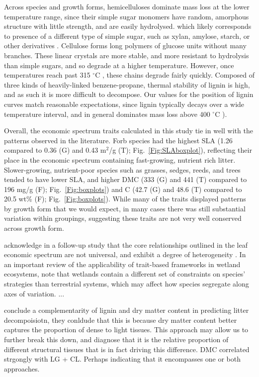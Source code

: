 \documentclass{article}
\begin{document}
Across species and growth forms, hemicelluloses dominate mass loss at the lower temperature range, since their simple sugar monomers have random, amorphous structure with little strength, and are easily hydrolysed. which likely corresponds to presence of a different type of simple sugar, such as xylan, amylose, starch, or other derivatives \citep{muller-hagedorn2007}. Cellulose forms long polymers of glucose units without many branches. These linear crystals are more stable, and more resistant to hydrolysis than simple sugars, and so degrade at a higher temperature. However, once temperatures reach past 315 $^{\circ}$C \citep{muller-hagedorn2007}, these chains degrade fairly quickly. Composed of three kinds of heavily-linked benzene-propane, thermal stability of lignin is high, and as such it is more difficult to decompose. Our values for the position of lignin curves match reasonable expectations, since lignin typically decays over a wide temperature interval, and in general dominates mass loss above 400 $^{\circ}$C \citetext{Fig.~\ref{Fig:rawLG} \citealp{chen2015,cai2013,cai2014,varhegyi2011}}). 

Overall, the economic spectrum traits calculated in this study tie in well with the patterns observed in the literature. Forb species had the highest SLA (1.26 compared to 0.36 (G) and 0.43 m$^2$/g (T); Fig.~\ref{Fig:SLAboxplot}), reflecting their place in the economic spectrum containing fast-growing, nutrient rich litter. Slower-growing, nutrient-poor species such as grasses, sedges, reeds, and trees tended to have lower SLA, and higher DMC (333 (G) and 441 (T) compared to 196 mg/g (F); Fig.~\ref{Fig:boxplots}) and C (42.7 (G) and 48.6 (T) compared to 20.5 wt\% (F); Fig.~\ref{Fig:boxplots}). 
While many of the traits displayed patterns by growth form that we would expect, in many cases there was still substantial variation within groupings, suggesting these traits are not very well conserved across growth form. 

\citet{wright2004} acknowledge in a follow-up study that the core relationships outlined in the leaf economic spectrum are not universal, and exhibit a degree of heterogeneity \citep{wright2005}. In an important review of the applicability of trait-based frameworks in wetland ecosystems, \cite{moor2017} note that wetlands contain a different set of constraints on species' strategies than terrestrial systems, which may affect how species segregate along axes of variation. ...

\citet{freschet2012} conclude a complementarity of lignin and dry matter content in predicting litter decompoisiotn, they conldude that this is because dry matter content better captures the proportion of dense to light tissues. This approach may allow us to further break this down, and diagnose that it is the relative proportion of different structural tissues that is in fact driving this difference. DMC correlated strgongly with LG + CL. Perhaps indicating that it encompasses one or both approaches. 
\end{document}
